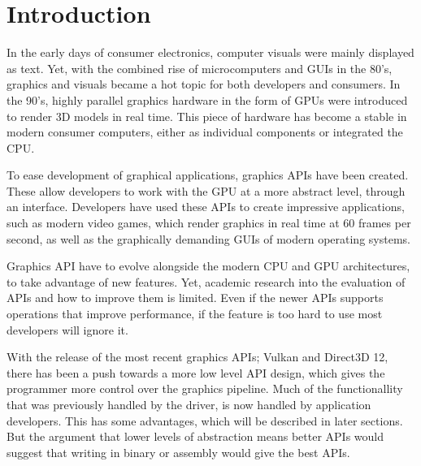 \chapter{Introduction}\label{ch:introduction}
In the early days of consumer electronics, computer visuals were mainly displayed as text.
Yet, with the combined rise of microcomputers and \glspl{GUI} in the 80's, graphics and visuals became a hot topic for both developers and consumers.  
In the 90's, highly parallel graphics hardware in the form of GPUs were introduced to render 3D models in real time.
This piece of hardware has become a stable in modern consumer computers, either as individual components or integrated the CPU.

To ease development of graphical applications, graphics \glspl{API} have been created. 
These allow developers to work with the GPU at a more abstract level, through an interface.
Developers have used these \glspl{API} to create impressive applications, such as modern video games, which render graphics in real time at 60 frames per second, as well as the graphically demanding \glspl{GUI} of modern operating systems.

Graphics \gls{API} have to evolve alongside the modern CPU and GPU architectures, to take advantage of new features. 
Yet, academic research into the evaluation of \glspl{API} and how to improve them is limited.
Even if the newer \glspl{API} supports operations that improve performance, if the feature is too hard to use most developers will ignore it.

With the release of the most recent graphics \glspl{API}; Vulkan and Direct3D 12, there has been a push towards a more low level API design, which gives the programmer more control over the graphics pipeline.
Much of the functionallity that was previously handled by the driver, is now handled by application developers. 
This has some advantages, which will be described in later sections. 
But the argument that lower levels of abstraction means better \glspl{API} would suggest that writing in binary or assembly would give the best \glspl{API}.

